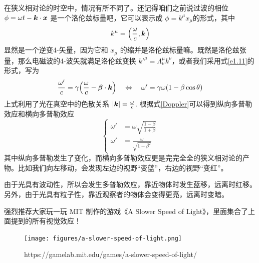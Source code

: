 \documentclass[12pt, a4paper, oneside]{ctexbook}
\begin{document}
\par   在狭义相对论的时空中，情况有所不同了。还记得咱们之前说过波的相位 $\phi=\omega t-\vb*{k}\cdot\vb*{x}$ 是一个洛伦兹标量吧，它可以表示成 $\phi=k^{\mu}x_{\mu}$的形式，其中 
\begin{equation}
	k^{\mu}=\qty(\frac{\omega}{c},\vb*{k})
\end{equation}
显然是一个逆变4-矢量，因为它和 $x_{\mu}$ 的缩并是洛伦兹标量嘛。既然是洛伦兹张量，那么电磁波的4-波矢就满足洛伦兹变换 $k'^{\mu}=\Lambda^{\mu}_{\nu}k^{\nu}$，或者我们采用式\eqref{e1.11}的形式，写为
\begin{equation}\label{Doppler}
	\frac{\omega'}{c}=\gamma\qty(\frac{\omega}{c}-\vb*{\beta}\cdot\vb*{k})\quad\Leftrightarrow\quad\omega'=\gamma\omega(1-\beta\cos\theta)
\end{equation}
上式利用了光在真空中的色散关系 $|\vb*{k}|=\frac{\omega}{c}$. 根据式\eqref{Doppler}可以得到纵向多普勒效应和横向多普勒效应
\begin{equation}
	\left\{\begin{aligned}
		\omega'&=\omega\sqrt{\frac{1-\beta}{1+\beta}}\\
		\omega'&=\frac{\omega}{\sqrt{1-\beta^{2}}}
	\end{aligned}\right.
\end{equation}
其中纵向多普勒发生了变化，而横向多普勒效应更是完完全全的狭义相对论的产物。比如我们向左移动，会发现左边的视野“变蓝”，右边的视野“变红”。

\par   由于光具有波动性，所以会发生多普勒效应，靠近物体时发生蓝移，远离时红移。另外，由于光具有粒子性，靠近观察者的物体会变得更亮，远离时变暗。

\par   强烈推荐大家玩一玩 MIT 制作的游戏《A Slower Speed of Light》，里面集合了上面提到的所有视觉效应！

\begin{figure}[H]
	\centering
	\texttt{[image: figures/a-slower-speed-of-light.png]}
	\caption{https://gamelab.mit.edu/games/a-slower-speed-of-light/}
\end{figure}
\end{document}

